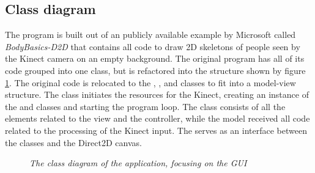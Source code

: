 \subsection{Class diagram}

The program is built out of an publicly available example by Microsoft called \emph{BodyBasics-D2D} that contains all code to draw 2D skeletons of people seen by the Kinect camera on an empty background. The original program has all of its code grouped into one class, but is refactored into the structure shown by figure \ref{fig: gui_classdiagram}. The original code is relocated to the , ,  and  classes to fit into a model-view structure. The  class initiates the resources for the Kinect, creating an instance of the  and  classes and starting the program loop. The  class consists of all the elements related to the view and the controller, while the model received all code related to the processing of the Kinect input. The  serves as an interface between the  classes and the Direct2D canvas.\\

\begin{figure}[H]
\caption{\emph{The class diagram of the application, focusing on the GUI}}
\label{fig: gui_classdiagram}
\end{figure}

